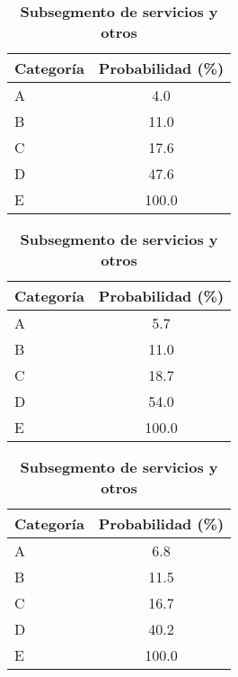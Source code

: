 \begin{table}[H]
\begin{subtable}[t]{0.32\textwidth}
\centering
\begin{tabular}{@{}lc@{}}
\toprule
\textbf{Categoría} & \textbf{Probabilidad (\%)} \\
\midrule
A & 4.0 \\
B & 11.0 \\
C & 17.6 \\
D & 47.6 \\
E & 100.0 \\
\bottomrule
\end{tabular}
\caption{\textbf{Subsegmento de servicios y otros}}
\end{subtable}
\hfill
\begin{subtable}[t]{0.32\textwidth}
\centering
\begin{tabular}{@{}lc@{}}
\toprule
\textbf{Categoría} & \textbf{Probabilidad (\%)} \\
\midrule
A & 5.7 \\
B & 11.0 \\
C & 18.7 \\
D & 54.0 \\
E & 100.0 \\
\bottomrule
\end{tabular}
\caption{\textbf{Subsegmento de comercio}}
\end{subtable}
\hfill
\begin{subtable}[t]{0.32\textwidth}
\centering
\begin{tabular}{@{}lc@{}}
\toprule
\textbf{Categoría} & \textbf{Probabilidad (\%)} \\
\midrule
A & 6.8 \\
B & 11.5 \\
C & 16.7 \\
D & 40.2 \\
E & 100.0 \\
\bottomrule
\end{tabular}
\caption{\textbf{Subsegmento de servicios y otros}}
\end{subtable}
\end{table}\label{categorias}
